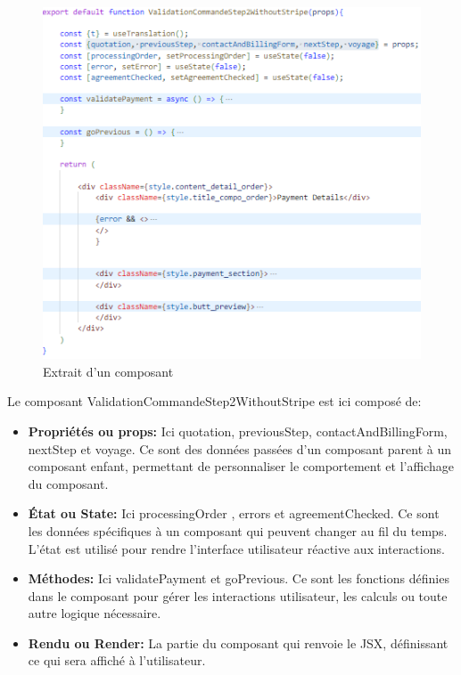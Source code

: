 \documentclass[12pt]{report}
\begin{document}
			\begin{figure}[h]
				\centering
				\includegraphics[width=\textwidth]{component.jpg}
				\caption{Extrait d'un composant}
				\label{fig:component}
			\end{figure}
			\FloatBarrier
			
			Le composant ValidationCommandeStep2WithoutStripe est ici composé de:

			\begin{itemize}
				\item \textbf{Propriétés ou props:} Ici quotation, previousStep, contactAndBillingForm, nextStep et voyage. Ce sont des données passées d'un composant parent à un composant enfant, permettant de personnaliser le comportement et l'affichage du composant.
				\item \textbf{État ou State:} Ici processingOrder , errors et agreementChecked. Ce sont les données spécifiques à un composant qui peuvent changer au fil du temps. L'état est utilisé pour rendre l'interface utilisateur réactive aux interactions.
				\item \textbf{Méthodes:} Ici validatePayment et goPrevious. Ce sont les fonctions définies dans le composant pour gérer les interactions utilisateur, les calculs ou toute autre logique nécessaire.
				\item \textbf{Rendu ou Render:} La partie du composant qui renvoie le JSX, définissant ce qui sera affiché à l'utilisateur.
			\end{itemize}
\end{document}
